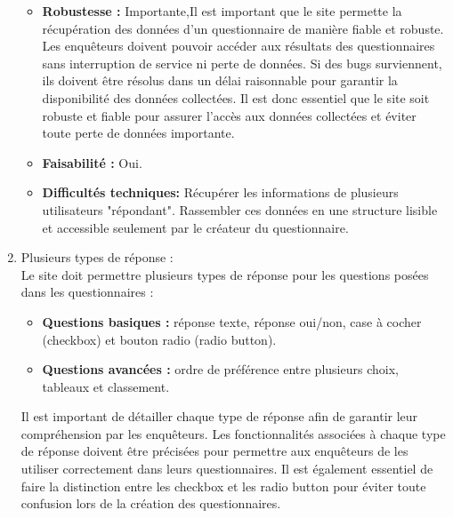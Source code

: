 \documentclass{article}
\begin{document}
\begin{enumerate}[noitemsep]
\begin{itemize}[noitemsep]
    \item \textbf{Robustesse : }Importante,Il est important que le site permette la récupération des données d'un questionnaire de manière fiable et robuste. Les enquêteurs doivent pouvoir accéder aux résultats des questionnaires sans interruption de service ni perte de données. Si des bugs surviennent, ils doivent être résolus dans un délai raisonnable pour garantir la disponibilité des données collectées. Il est donc essentiel que le site soit robuste et fiable pour assurer l'accès aux données collectées et éviter toute perte de données importante.\\

    \item \textbf{Faisabilité : }Oui.\\
    \item \textbf{Difficultés techniques: } Récupérer les informations de plusieurs utilisateurs "répondant". Rassembler ces données en une structure lisible et accessible seulement par le créateur du questionnaire.
\end{itemize}
\newpage
\item Plusieurs types de réponse :\\
Le site doit permettre plusieurs types de réponse pour les questions posées dans les questionnaires :
\begin{itemize}
\item \textbf{Questions basiques :} réponse texte, réponse oui/non, case à cocher (checkbox) et bouton radio (radio button).
\item \textbf{Questions avancées :} ordre de préférence entre plusieurs choix, tableaux et classement.
\end{itemize}

Il est important de détailler chaque type de réponse afin de garantir leur compréhension par les enquêteurs. Les fonctionnalités associées à chaque type de réponse doivent être précisées pour permettre aux enquêteurs de les utiliser correctement dans leurs questionnaires. Il est également essentiel de faire la distinction entre les checkbox et les radio button pour éviter toute confusion lors de la création des questionnaires.


\end{enumerate}
\end{document}
